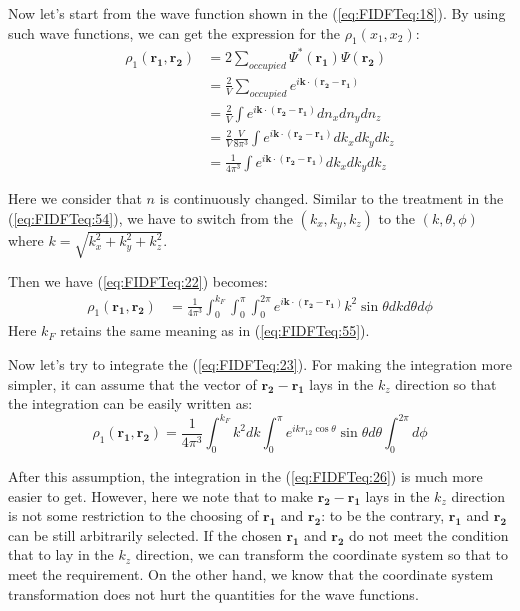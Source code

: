 Now let's start from the wave function shown in the
(\ref{eq:FIDFTeq:18}). By using such wave functions, we can get the
expression for the $\rho_{1}(x_{1},x_{2})$:
\begin{align}
\label{eq:FIDFTeq:22}
\rho_{1}(\mathbf{r_{1}}, \mathbf{r_{2}}) &=
2\sum_{occupied}\Psi^{*}(\mathbf{r_{1}})\Psi(\mathbf{r_{2}}) \nonumber \\
&=\frac{2}{V}\sum_{occupied}e^{i\mathbf{k}\cdot
(\mathbf{r_{2}}-\mathbf{r_{1}})} \nonumber \\
&=\frac{2}{V} \int
e^{i\mathbf{k}\cdot
(\mathbf{r_{2}}-\mathbf{r_{1}})}dn_{x}dn_{y}dn_{z} \nonumber \\
&=\frac{2}{V}\frac{V}{8\pi^{3}}\int e^{i\mathbf{k}\cdot
(\mathbf{r_{2}}-\mathbf{r_{1}})}dk_{x}dk_{y}dk_{z} \nonumber \\
&=\frac{1}{4\pi^{3}}\int e^{i\mathbf{k}\cdot
(\mathbf{r_{2}}-\mathbf{r_{1}})}dk_{x}dk_{y}dk_{z}
\end{align}

Here we consider that $n$ is continuously changed. Similar to the
treatment in the (\ref{eq:FIDFTeq:54}), we have to switch from the
$(k_{x}, k_{y}, k_{z})$ to the $(k, \theta, \phi)$ where $k =
\sqrt{k_{x}^{2} + k_{y}^{2} + k_{z}^{2}}$.

Then we have (\ref{eq:FIDFTeq:22}) becomes:
\begin{align}\label{eq:FIDFTeq:23}
\rho_{1}(\mathbf{r_{1}},\mathbf{r_{2}})&=\frac{1}{4\pi^{3}}
\int_{0}^{k_{F}}\int_{0}^{\pi}\int_{0}^{2\pi}e^{i\mathbf{k}\cdot
(\mathbf{r_{2}}-\mathbf{r_{1}})}k^{2}\sin\theta dkd\theta d\phi
\end{align}
Here $k_{F}$ retains the same meaning as in (\ref{eq:FIDFTeq:55}).

Now let's try to integrate the (\ref{eq:FIDFTeq:23}). For making the
integration more simpler, it can assume that the vector of
$\mathbf{r_{2}}-\mathbf{r_{1}}$ lays in the $k_{z}$ direction so
that the integration can be easily written as:
\begin{equation}\label{eq:FIDFTeq:26}
\rho_{1}(\mathbf{r_{1}},\mathbf{r_{2}})=\frac{1}{4\pi^{3}}
\int_{0}^{k_{F}}k^{2}dk
\int_{0}^{\pi}e^{ikr_{12}\cos\theta}\sin\theta d\theta
\int_{0}^{2\pi}d\phi
\end{equation}

After this assumption, the integration in the (\ref{eq:FIDFTeq:26})
is much more easier to get. However, here we note that to make
$\mathbf{r_{2}}-\mathbf{r_{1}}$ lays in the $k_{z}$ direction is not
some restriction to the choosing of $\mathbf{r_{1}}$ and
$\mathbf{r_{2}}$: to be the contrary, $\mathbf{r_{1}}$ and
$\mathbf{r_{2}}$ can be still arbitrarily selected. If the chosen
$\mathbf{r_{1}}$ and $\mathbf{r_{2}}$ do not meet the condition that
to lay in the $k_{z}$ direction, we can transform the coordinate
system so that to meet the requirement. On the other hand, we know
that the coordinate system transformation does not hurt the
quantities for the wave functions.

